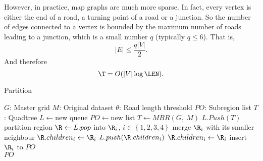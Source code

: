


However, in practice, map graphs are much more sparse. In fact, 
every vertex is either the end of a road, a turning point of a road or a junction. 
So the number of edges connected to a vertex is bounded by the maximum number of 
roads leading to a junction, which is a small number $q$ (typically $q \le 6$). 
That is,
\[|E| \le \frac{q|V|}{2}. \]
And therefore
\[\T = O(|V|\log\LEN).\]


\begin{algorithm}[th]
\caption{Partition}
\label{Partition}
\begin{algorithmic}[1]
\Require
\State 	  $G$: Master grid 
\State    $M$: Original dataset
\State    $\theta$: Road length threshold
\Ensure
\State    $PO$: Subregion list
\State    $T$: Quadtree
\State $L\leftarrow$new queue
\State $PO\leftarrow$new list
\State $T\leftarrow MBR(G,~M)$
\State $L.Push(T)$
\State partition region $\R \leftarrow L.pop$ into ${\R}_{i}$, $i\in \left\{1,2,3,4\right\}$
\State merge ${\R}_{i}$ with its smaller neighbour
\State $\R.children_i \leftarrow {\R}_{i}$ 
\State  $L.push(\R.children_i)$
\Else{}
\State $\R.children_i \leftarrow {\R}_{i}$
\State insert ${\R}_{i}$ to $PO$
\EndIf
\EndFor
\EndWhile\\
\Return $PO$
\EndFunction
\end{algorithmic}
\end{algorithm}


